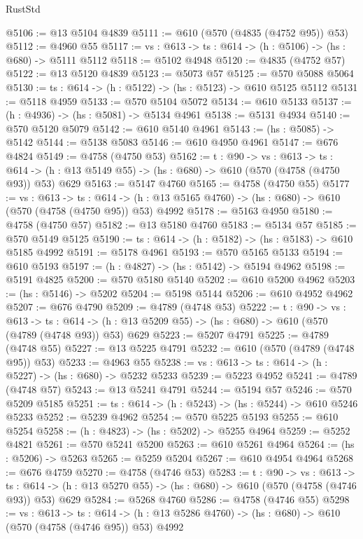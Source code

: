 \begin{lexlean}{RustStd}
\begin{coremodule}
@5106 := @13 @5104 @4839
@5111 := @610 (@570 (@4835 (@4752 @95)) @53)
@5112 := @4960 @55
@5117 := {vs : @613} -> {ts : @614} -> (h : @5106) -> (hs : @680) -> @5111 @5112
@5118 := @5102 @4948
@5120 := @4835 (@4752 @57)
@5122 := @13 @5120 @4839
@5123 := @5073 @57
@5125 := @570 @5088 @5064
@5130 := {ts : @614} -> (h : @5122) -> (hs : @5123) -> @610 @5125 @5112
@5131 := @5118 @4959
@5133 := @570 @5104 @5072
@5134 := @610 @5133
@5137 := (h : @4936) -> (hs : @5081) -> @5134 @4961
@5138 := @5131 @4934
@5140 := @570 @5120 @5079
@5142 := @610 @5140 @4961
@5143 := (hs : @5085) -> @5142
@5144 := @5138 @5083
@5146 := @610 @4950 @4961
@5147 := @676 @4824
@5149 := @4758 (@4750 @53)
@5162 := {t : @90} ->
  {vs : @613} ->
  {ts : @614} -> (h : @13 @5149 @55) -> (hs : @680) -> @610 (@570 (@4758 (@4750 @93)) @53) @629
@5163 := @5147 @4760
@5165 := @4758 (@4750 @55)
@5177 := {vs : @613} ->
  {ts : @614} -> (h : @13 @5165 @4760) -> (hs : @680) -> @610 (@570 (@4758 (@4750 @95)) @53) @4992
@5178 := @5163 @4950
@5180 := @4758 (@4750 @57)
@5182 := @13 @5180 @4760
@5183 := @5134 @57
@5185 := @570 @5149 @5125
@5190 := {ts : @614} -> (h : @5182) -> (hs : @5183) -> @610 @5185 @4992
@5191 := @5178 @4961
@5193 := @570 @5165 @5133
@5194 := @610 @5193
@5197 := (h : @4827) -> (hs : @5142) -> @5194 @4962
@5198 := @5191 @4825
@5200 := @570 @5180 @5140
@5202 := @610 @5200 @4962
@5203 := (hs : @5146) -> @5202
@5204 := @5198 @5144
@5206 := @610 @4952 @4962
@5207 := @676 @4790
@5209 := @4789 (@4748 @53)
@5222 := {t : @90} ->
  {vs : @613} ->
  {ts : @614} -> (h : @13 @5209 @55) -> (hs : @680) -> @610 (@570 (@4789 (@4748 @93)) @53) @629
@5223 := @5207 @4791
@5225 := @4789 (@4748 @55)
@5227 := @13 @5225 @4791
@5232 := @610 (@570 (@4789 (@4748 @95)) @53)
@5233 := @4963 @55
@5238 := {vs : @613} -> {ts : @614} -> (h : @5227) -> (hs : @680) -> @5232 @5233
@5239 := @5223 @4952
@5241 := @4789 (@4748 @57)
@5243 := @13 @5241 @4791
@5244 := @5194 @57
@5246 := @570 @5209 @5185
@5251 := {ts : @614} -> (h : @5243) -> (hs : @5244) -> @610 @5246 @5233
@5252 := @5239 @4962
@5254 := @570 @5225 @5193
@5255 := @610 @5254
@5258 := (h : @4823) -> (hs : @5202) -> @5255 @4964
@5259 := @5252 @4821
@5261 := @570 @5241 @5200
@5263 := @610 @5261 @4964
@5264 := (hs : @5206) -> @5263
@5265 := @5259 @5204
@5267 := @610 @4954 @4964
@5268 := @676 @4759
@5270 := @4758 (@4746 @53)
@5283 := {t : @90} ->
  {vs : @613} ->
  {ts : @614} -> (h : @13 @5270 @55) -> (hs : @680) -> @610 (@570 (@4758 (@4746 @93)) @53) @629
@5284 := @5268 @4760
@5286 := @4758 (@4746 @55)
@5298 := {vs : @613} ->
  {ts : @614} -> (h : @13 @5286 @4760) -> (hs : @680) -> @610 (@570 (@4758 (@4746 @95)) @53) @4992

\end{coremodule}
\end{lexlean}
